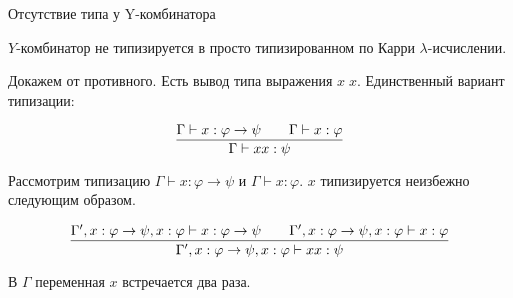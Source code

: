 \documentclass[aspectratio=169]{beamer}
\begin{document}
\begin{frame}{Отсутствие типа у Y-комбинатора}

\begin{thm}
	$Y$-комбинатор не типизируется в просто типизированном по Карри $\lambda$-исчислении.
\end{thm}








Докажем от противного. Есть вывод типа выражения $x \; x$. Единственный вариант типизации:

$$\infer{\Gamma \vdash x x: \psi}{\Gamma \vdash x: \varphi \rightarrow \psi && \Gamma \vdash x: \varphi }$$

Рассмотрим типизацию $\Gamma \vdash x: \varphi \rightarrow \psi$ и $\Gamma \vdash x: \varphi$. 
$x$ типизируется неизбежно следующим образом.

$$\infer{\Gamma', x: \varphi \rightarrow \psi, x: \varphi \vdash x x: \psi}{\Gamma', x: \varphi \rightarrow \psi, x: \varphi \vdash x: \varphi \rightarrow \psi && \Gamma', x: \varphi \rightarrow \psi, x: \varphi \vdash x: \varphi }$$

В $\Gamma$ переменная $x$ встречается два раза.
\end{frame}
\end{document}
